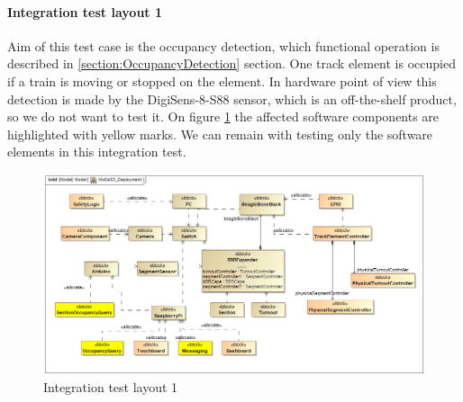 \paragraph{Integration test layout 1}
Aim of this test case is the occupancy detection, which functional operation is described in \ref{section:OccupancyDetection} section. One track element is occupied if a train is moving or stopped on the element. In hardware point of view this detection is made by the DigiSens-8-S88 sensor, which is an off-the-shelf product, so we do not want to test it. On figure \ref{fig:MoDeS3_Deployment-test1} the affected software components are highlighted with yellow marks. We can remain with testing only the software elements in this integration test.
\begin{figure}[!h]
	\centering
	\includegraphics[width=150mm, keepaspectratio]{figures/testDesign/testLayoutSYSML/MoDeS3_Deployment-test1.png}
	\caption{Integration test layout 1}
	\label{fig:MoDeS3_Deployment-test1}
\end{figure}

